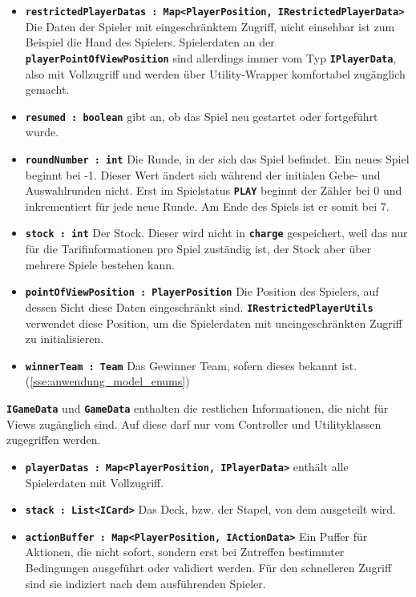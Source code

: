 \documentclass[
							a4paper, 
							11pt, 
							openany, 
							liststotoc,
							parskip=half, 
   							headings=normal
						]{scrreprt}
\begin{document}
{\begin{itemize}
	\item \textbf{\texttt{restrictedPlayerDatas : Map{\textless}PlayerPosition, IRestrictedPlayerData{\textgreater}}}\newline
Die Daten der Spieler mit eingeschränktem Zugriff, nicht einsehbar ist zum Beispiel die Hand des Spielers. Spielerdaten an der \textbf{\texttt{playerPointOfViewPosition}} sind allerdings immer vom Typ \textbf{\texttt{IPlayerData}}, also mit Vollzugriff und werden über Utility-Wrapper komfortabel zugänglich gemacht.
	\item \textbf{\texttt{resumed : boolean}} gibt an, ob das Spiel neu gestartet oder fortgeführt wurde.
	\item \textbf{\texttt{roundNumber : int}} Die Runde, in der sich das Spiel befindet. Ein neues Spiel beginnt bei -1. Dieser Wert ändert sich während der initialen Gebe- und Auswahlrunden nicht. Erst im Spielstatus \textbf{\texttt{PLAY}} beginnt der Zähler bei 0 und inkrementiert für jede neue Runde. Am Ende des Spiels ist er somit bei 7.
	\item \textbf{\texttt{stock : int}} Der Stock. Dieser wird nicht in \textbf{\texttt{charge}} gespeichert, weil das nur für die Tarifinformationen pro Spiel zuständig ist, der Stock aber über mehrere Spiele bestehen kann.
	\item \textbf{\texttt{pointOfViewPosition : PlayerPosition}} Die Position des Spielers, auf dessen Sicht diese Daten eingeschränkt sind. \textbf{\texttt{IRestrictedPlayerUtils}} verwendet diese Position, um die Spielerdaten mit uneingeschränkten Zugriff zu initialisieren.
	\item \textbf{\texttt{winnerTeam : Team}} Das Gewinner Team, sofern dieses bekannt ist. (\autoref{sse:anwendung_model_enums})
\end{itemize}\bigskip

\textbf{\texttt{IGameData}} und \textbf{\texttt{GameData}} enthalten die restlichen Informationen, die nicht für Views zugänglich sind. Auf diese darf nur vom Controller und Utilityklassen zugegriffen werden.

\begin{itemize}
	\item \textbf{\texttt{playerDatas : Map{\textless}PlayerPosition, IPlayerData{\textgreater}}} enthält alle Spielerdaten mit Vollzugriff.
	\item \textbf{\texttt{stack : List{\textless}ICard{\textgreater}}} Das Deck, bzw. der Stapel, von dem ausgeteilt wird.
	\item \textbf{\texttt{actionBuffer : Map{\textless}PlayerPosition, IActionData{\textgreater}}} Ein Puffer für Ak\-ti\-on\-en, die nicht sofort, sondern erst bei Zutreffen bestimmter Bedingungen aus\-ge\-führt oder validiert werden. Für den schnelleren Zugriff sind sie indiziert nach dem ausführenden Spieler.
\end{itemize}\bigskip

}
\end{document}
